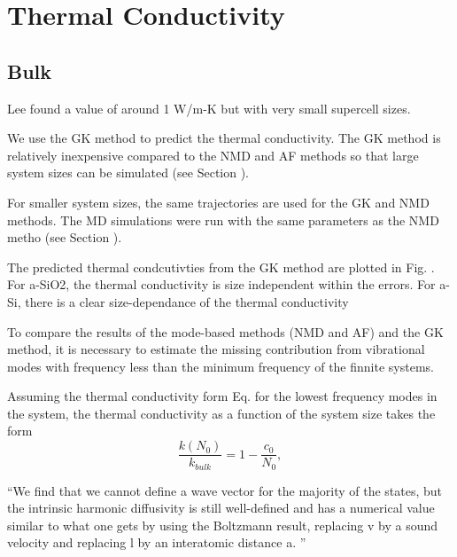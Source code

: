 \documentclass[aps,prb,twocolumn,superscriptaddress,footinbib,amsmath,amssymb,floatfix]{revtex4}
\begin{document}

\section{\label{S:Conductivity}Thermal Conductivity}

\subsection{\label{S:Bulk}Bulk}

Lee found a value of around 1 W/m-K 
but with very small supercell sizes.\cite{lee_molecular-dynamics_1991}

We use the GK method to predict the thermal conductivity. The GK method 
is relatively inexpensive compared to the NMD and AF methods so that 
large system sizes 
can be simulated (see Section ).  

For smaller system sizes, the same trajectories are used for the GK and 
NMD methods. The MD simulations were run with the same parameters 
as the NMD metho (see Section ). 

The predicted thermal condcutivties from the GK method are plotted 
in Fig. . For a-SiO2, the thermal conductivity is size independent 
within the errors.  For a-Si, there is a clear size-dependance of the 
thermal conductivity

To compare the results of the mode-based methods (NMD and AF) and 
the GK method, it is necessary to estimate the missing contribution from 
vibrational modes with frequency less than the minimum frequency of 
the finnite systems. 

Assuming the thermal conductivity form Eq.  for the lowest frequency modes in 
the system, the thermal conductivity as a function of the system size 
takes the form
\begin{equation}\label{EQ:k0}
\frac{k(N_0)}{k_{bulk}} = 1 - \frac{c_0}{N_0},
\end{equation}

``We find that we cannot define a wave vector for the
majority of the states, but the intrinsic harmonic diffusivity is still well-defined and has a numerical value
similar to what one gets by using the Boltzmann result, replacing v by a sound velocity and replacing l by
an interatomic distance a.
''\cite{feldman_thermal_1993}
\end{document}
